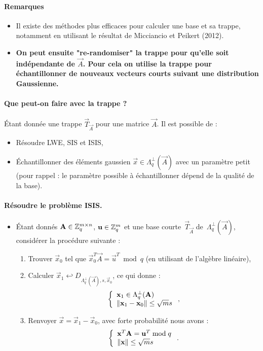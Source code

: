 \paragraph{Remarques} 
\begin{itemize}
\item Il existe des méthodes plus efficaces pour calculer une base et sa trappe, notamment en utilisant le résultat de Micciancio et Peikert (2012).
\item \textbf{On peut ensuite "re-randomiser" la trappe pour qu'elle soit indépendante de $\vec{A}$. Pour cela on utilise la trappe pour échantillonner de nouveaux vecteurs courts suivant une distribution Gaussienne.}
\end{itemize} 


\paragraph{Que peut-on faire avec la trappe ?} \'Etant donnée une trappe $\vec{T}_{\vec{A}}$ pour une matrice $\vec{A}$. Il est possible de :
\begin{itemize}
\item Résoudre LWE, SIS et ISIS,
\item Échantillonner des éléments gaussien $\vec{x} \in \Lambda_q^{\perp}(\vec{A})$ avec un paramètre petit (pour rappel : le paramètre possible à échantillonner dépend de la qualité de la base).
\end{itemize}

\paragraph{Résoudre le problème ISIS.}
\begin{itemize}

\item \'Etant donnés $\mathbf{A} \in \mathbb{Z}_q^{m \times n}$, $\mathbf{u} \in \mathbb{Z}_q^m$ et une base courte~$\vec{T}_{\vec{A}}$ de~$\Lambda_q^{\perp}(\vec{A})$,
considérer la procédure suivante :
\begin{enumerate}
\item Trouver $\vec{x}_0$ tel que $\vec{x}_0^T \vec{A} = \vec{u}^T \bmod q$ (en utilisant de l'algèbre linéaire),
\item Calculer $\vec{x}_1 \hookleftarrow D_{\Lambda_q^{\perp}(\vec{A}),s,\vec{x}_0}$, ce qui donne :
\[
\left\lbrace 
\begin{array}{l}
\mathbf{x}_1 \in \Lambda_q^{\perp}(\mathbf{A}) \\
\Vert \mathbf{x}_1 - \mathbf{x}_0 \Vert \leq \sqrt{m} s
\end{array} \right. ,
\]
\item Renvoyer $\vec{x} = \vec{x}_1 - \vec{x}_0$, avec forte probabilité nous avons :
\[
\left\lbrace 
\begin{array}{l}
\mathbf{x}^T \mathbf{A} = \mathbf{u}^T \bmod q\\
\Vert \mathbf{x} \Vert \leq \sqrt{m} s
\end{array} \right. .
\]
\end{enumerate}
\end{itemize}

